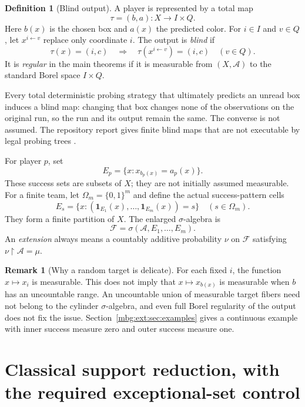 \documentclass[11pt,letterpaper]{article}
\theoremstyle{definition}
\newtheorem{definition}[theorem]{Definition}
\newtheorem{remark}[theorem]{Remark}
\newcommand{\ind}{\mathbf 1}
\newcommand{\restr}{\mathbin{\upharpoonright}}
\newcommand{\Fext}{\mathcal F}
\newcommand{\A}{\mathcal A}
\begin{document}
\begin{definition}[Blind output]
A player is represented by a total map
\[
\tau=(b,a):X\longrightarrow I\times Q.
\]
Here $b(x)$ is the chosen box and $a(x)$ the predicted color. For $i\in I$ and $v\in Q$, let $x^{i\leftarrow v}$ replace only coordinate $i$. The output is \emph{blind} if
\begin{equation}
\tau(x)=(i,c)\quad\Longrightarrow\quad
\tau(x^{i\leftarrow v})=(i,c)\quad(v\in Q).
\label{mbg:ext:eq:blind}
\end{equation}
It is \emph{regular} in the main theorems if it is measurable from $(X,\A)$ to the standard Borel space $I\times Q$.
\end{definition}

Every total deterministic probing strategy that ultimately predicts an unread box induces a blind map: changing that box changes none of the observations on the original run, so the run and its output remain the same. The converse is not assumed. The repository report gives finite blind maps that are not executable by legal probing trees \cite{ext:RepoReport}.

For player $p$, set
\[
E_p=\{x:x_{b_p(x)}=a_p(x)\}.
\]
These success sets are subsets of $X$; they are not initially assumed measurable. For a finite team, let $\Omega_m=\{0,1\}^m$ and define the actual success-pattern cells
\[
E_s=\{x:(\ind_{E_1}(x),\ldots,\ind_{E_m}(x))=s\}
\quad(s\in\Omega_m).
\]
They form a finite partition of $X$. The enlarged $\sigma$-algebra is
\[
\Fext=\sigma(\A,E_1,\ldots,E_m).
\]
An \emph{extension} always means a countably additive probability $\nu$ on $\Fext$ satisfying $\nu\restr\A=\mu$.

\begin{remark}[Why a random target is delicate]
For each fixed $i$, the function $x\mapsto x_i$ is measurable. This does not imply that $x\mapsto x_{b(x)}$ is measurable when $b$ has an uncountable range. An uncountable union of measurable target fibers need not belong to the cylinder $\sigma$-algebra, and even full Borel regularity of the output does not fix the issue. Section~\ref{mbg:ext:sec:examples} gives a continuous example with inner success measure zero and outer success measure one.
\end{remark}

\section{Classical support reduction, with the required exceptional-set control}
\label{mbg:ext:sec:support}
\end{document}
